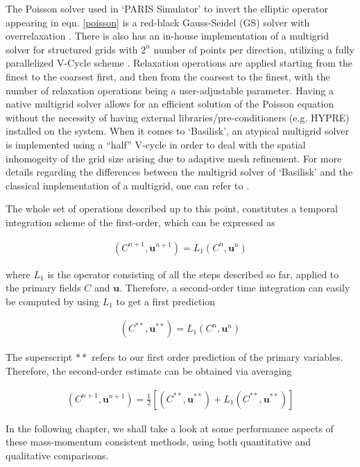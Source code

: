 The Poisson solver used in `PARIS Simulator' to invert the elliptic operator 
appearing in eqn. \ref{poisson} is a red-black 
Gauss-Seidel (GS) solver with overrelaxation . 
There is also has an in-house implementation of a multigrid solver 
for structured grids with $2^{n}$ number of points per direction, 
utilizing a fully parallelized V-Cycle scheme \cite{briggs1987}. 
Relaxation operations are applied starting from the finest to the coarsest first, 
and then from the coarsest to the finest, with the number of relaxation operations 
being a user-adjustable parameter. Having a native multigrid solver allows 
for an efficient solution of the Poisson equation without the necessity
of having external libraries/pre-conditioners (e.g. HYPRE) installed on the system.
When it comes to `Basilisk', an atypical multigrid solver is implemented using 
a ``half'' V-cycle in order to deal with the spatial inhomogeity of the grid size
arising due to adaptive mesh refinement. 
For more details regarding the differences between the multigrid solver of `Basilisk'
and the classical implementation of a multigrid, one can refer to .


The whole set of operations described up to this point, 
constitutes a temporal integration scheme of the first-order, which can be expressed as 

\begin{align}
\left(C^{n+1},\boldsymbol{u}^{n+1}\right) = L_{1}\left( C^{n},\boldsymbol{u}^{n} \right)
\end{align}

where $L_{1}$ is the operator consisting of all the steps described 
so far, applied to the primary fields $C$ and $\boldsymbol{u}$. 
Therefore, a second-order time integration can easily be 
computed by using $L_{1}$ to get a first prediction    

\begin{align}
\left(C^{**},\boldsymbol{u}^{**}\right) = L_{1}\left( C^{n},\boldsymbol{u}^{n} \right)
\end{align}

The superscript $**$ refers to our first order prediction of the primary variables. 
Therefore, the second-order estimate can be obtained via averaging   

\begin{align}
\left(C^{n+1},\boldsymbol{u}^{n+1}\right) = \frac{1}{2}\left[ \left(C^{**},\boldsymbol{u}^{**} \right) + L_{1}\left( C^{**},\boldsymbol{u}^{**} \right) \right]
\end{align}



In the following chapter, we shall take a look at some performance 
aspects of these mass-momentum consistent methods,
using both quantitative and qualitative comparisons. 

